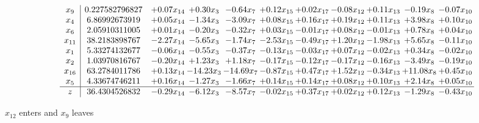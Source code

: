 \documentclass[9pt]{article}
\begin{document}
 \[\begin{array}{c| c c@{\hskip 2pt} c@{\hskip 2pt} c@{\hskip 2pt} c@{\hskip 2pt} c@{\hskip 2pt} c@{\hskip 2pt} c@{\hskip 2pt} c@{\hskip 2pt} c@{\hskip 2pt} }
 x_{9}   &  0.227582796827 & +  0.07 x_{14} & +  0.30 x_{3} & -0.64 x_{7} & +  0.12 x_{15} & +  0.02 x_{17} & -0.08 x_{12} & +  0.11 x_{13} & -0.19 x_{8} & -0.07 x_{10}\\
 x_{4}   &  6.86992673919 & +  0.05 x_{14} & -1.34 x_{3} & -3.09 x_{7} & +  0.08 x_{15} & +  0.16 x_{17} & +  0.19 x_{12} & +  0.11 x_{13} & +  3.98 x_{8} & +  0.10 x_{10}\\
 x_{6}   &  2.05910311005 & +  0.01 x_{14} & -0.20 x_{3} & -0.32 x_{7} & +  0.03 x_{15} & -0.01 x_{17} & +  0.08 x_{12} & -0.01 x_{13} & +  0.78 x_{8} & +  0.04 x_{10}\\
 x_{11}   &  38.2183898767 & -2.27 x_{14} & -5.65 x_{3} & -1.74 x_{7} & -2.53 x_{15} & -0.49 x_{17} & +  1.20 x_{12} & -1.98 x_{13} & +  5.65 x_{8} & -0.11 x_{10}\\
 x_{1}   &  5.33274132677 & -0.06 x_{14} & -0.55 x_{3} & -0.37 x_{7} & -0.13 x_{15} & -0.03 x_{17} & +  0.07 x_{12} & -0.02 x_{13} & +  0.34 x_{8} & -0.02 x_{10}\\
 x_{2}   &  1.03970816767 & -0.20 x_{14} & +  1.23 x_{3} & +  1.18 x_{7} & -0.17 x_{15} & -0.12 x_{17} & -0.17 x_{12} & -0.16 x_{13} & -3.49 x_{8} & -0.19 x_{10}\\
 x_{16}   &  63.2784011786 & +  0.13 x_{14} & -14.23 x_{3} & -14.69 x_{7} & -0.87 x_{15} & +  0.47 x_{17} & +  1.52 x_{12} & -0.34 x_{13} & + 11.08 x_{8} & +  0.45 x_{10}\\
 x_{5}   &  4.33674746211 & +  0.16 x_{14} & -1.27 x_{3} & -1.66 x_{7} & +  0.14 x_{15} & +  0.14 x_{17} & +  0.08 x_{12} & +  0.10 x_{13} & +  2.14 x_{8} & +  0.05 x_{10}\\
\hline
z    &  36.4304526832 & -0.29 x_{14} & -6.12 x_{3} & -8.57 x_{7} & -0.02 x_{15} & +  0.37 x_{17} & +  0.02 x_{12} & +  0.12 x_{13} & -1.29 x_{8} & -0.43 x_{10}\\
\end{array}\]


 $ x_{12} $ enters and $ x_{9} $ leaves 
\end{document}
